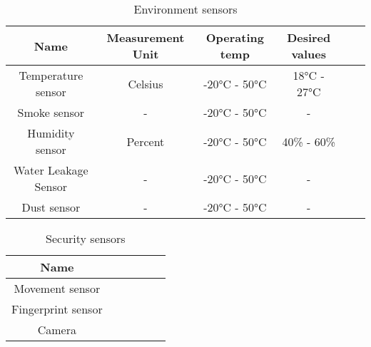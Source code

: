             \begin{table}
                \centering
                \caption{Environment sensors}
                \begin{tabular}{ |c|c|c|c|c|c|}
                    \hline
                    {\textbf{Name}} & {\textbf{Measurement Unit}} & {\textbf{Operating temp}}& {\textbf{Desired values}}   \\ 
                    \hline

                    Temperature sensor & Celsius & -20°C - 50°C & 18°C - 27°C\\
                    \hline
                    Smoke sensor &  - & -20°C - 50°C & -  \\
                    \hline
                    Humidity sensor & Percent &  -20°C - 50°C & 40\% - 60\% \\
                    \hline
                    Water Leakage Sensor &  - & -20°C - 50°C & -  \\
                    \hline
                    Dust sensor &  - & -20°C - 50°C & -  \\
                    \hline
                \end{tabular}
                \label {table:envirement_sen}
            \end{table}
        
            \begin{table}
                \centering
                \caption{Security sensors}
                \begin{tabular}{ |c|c|c|c|c|c|}
                    \hline
                    {\textbf{Name}}  \\ 
                    \hline

                    Movement sensor  \\
                    \hline
                    Fingerprint sensor  \\
                    \hline
                    Camera \\
                    \hline
                \end{tabular}
                \label{table:security_sen}
            \end{table}
          


